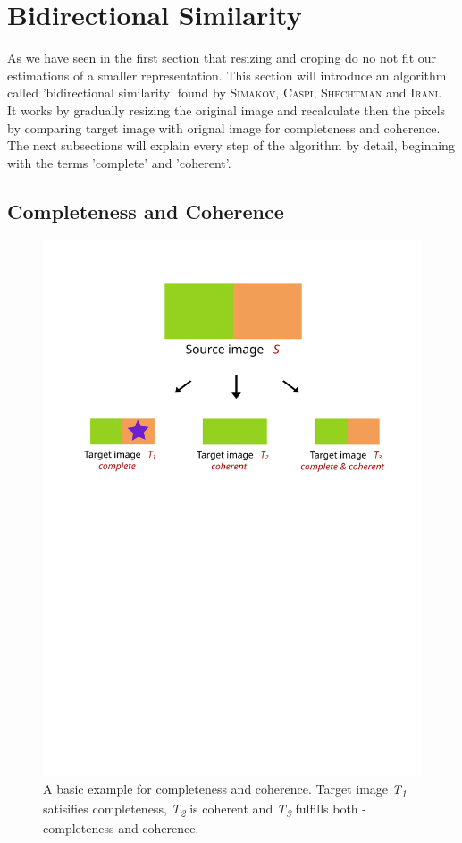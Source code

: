 \section{Bidirectional Similarity}
As we have seen in the first section that resizing and croping do no not fit our estimations of a smaller representation. This section will introduce an algorithm called 'bidirectional similarity' found by \textsc{Simakov, Caspi, Shechtman} and \textsc{Irani}.\\
It works by gradually resizing the original image and recalculate then the pixels by comparing target image with orignal image for completeness and coherence.\\
The next subsections will explain every step of the algorithm by detail, beginning with the terms 'complete' and 'coherent'.

\subsection{Completeness and Coherence}
\begin{figure}[h]
\centering
\includegraphics[scale=0.6]{img/cac}
\caption[Completeness and Coherence]{A basic example for completeness and coherence. Target image \textit{T\textsubscript{1}} satisifies completeness, \textit{T\textsubscript{2}} is coherent and \textit{T\textsubscript{3}} fulfills both - completeness and coherence.}
\label{fig:Completeness and Coherence}
\end{figure}

